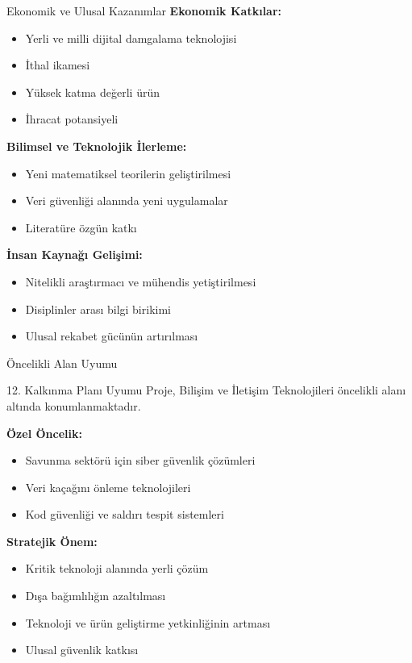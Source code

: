 \documentclass[aspectratio=169,xcolor={dvipsnames}]{beamer}
\begin{document}
\begin{frame}{Ekonomik ve Ulusal Kazanımlar}
\textbf{Ekonomik Katkılar:}
\begin{itemize}
\item Yerli ve milli dijital damgalama teknolojisi
\item İthal ikamesi
\item Yüksek katma değerli ürün
\item İhracat potansiyeli
\end{itemize}

\vspace{0.3cm}

\textbf{Bilimsel ve Teknolojik İlerleme:}
\begin{itemize}
\item Yeni matematiksel teorilerin geliştirilmesi
\item Veri güvenliği alanında yeni uygulamalar
\item Literatüre özgün katkı
\end{itemize}

\vspace{0.3cm}

\textbf{İnsan Kaynağı Gelişimi:}
\begin{itemize}
\item Nitelikli araştırmacı ve mühendis yetiştirilmesi
\item Disiplinler arası bilgi birikimi
\item Ulusal rekabet gücünün artırılması
\end{itemize} %
\end{frame}

\begin{frame}{Öncelikli Alan Uyumu}
\begin{block}{12. Kalkınma Planı Uyumu}
Proje, Bilişim ve İletişim Teknolojileri öncelikli alanı altında konumlanmaktadır.
\end{block}

\textbf{Özel Öncelik:}
\begin{itemize}
\item Savunma sektörü için siber güvenlik çözümleri
\item Veri kaçağını önleme teknolojileri
\item Kod güvenliği ve saldırı tespit sistemleri
\end{itemize}

\vspace{0.3cm}

\textbf{Stratejik Önem:}
\begin{itemize}
\item Kritik teknoloji alanında yerli çözüm
\item Dışa bağımlılığın azaltılması
\item Teknoloji ve ürün geliştirme yetkinliğinin artması
\item Ulusal güvenlik katkısı
\end{itemize}
\end{frame}
\end{document}
